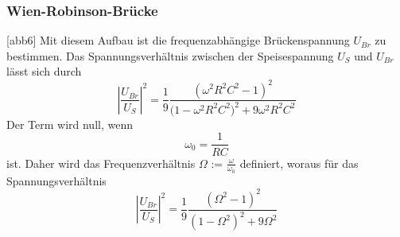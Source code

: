 \subsubsection{Wien-Robinson-Brücke}

[abb6]
Mit diesem Aufbau ist die frequenzabhängige Brückenspannung $U_{Br}$ zu bestimmen. Das Spannungsverhältnis
zwischen der Speisespannung $U_S$ und $U_{Br}$ lässt sich durch \begin{equation}
    \left|\frac{U_{Br}}{U_S}\right|^2 = \frac{1}{9}\frac{(\omega^2 R^2 C^2 -1)^2}{\bigl (1- \omega^2 R^2 C^2\bigr)^2 + 9\omega^2 R^2 C^2} 	
\end{equation}
Der Term wird null, wenn \begin{equation}
    \omega_0 = \frac{1}{RC}
\end{equation} ist. Daher wird das Frequenzverhältnis $\Omega$ := $\frac{\omega}{\omega_0}$ definiert, woraus für das
Spannungsverhältnis \begin{equation}
    \left|\frac{U_{Br}}{U_S}\right|^2 = \frac{1}{9}\frac{(\Omega^2 -1)^2}{(1- \Omega^2)^2 + 9\Omega^2}
\end{equation}





